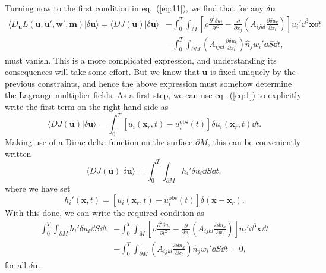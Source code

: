 Turning now to the first condition in eq.~(\ref{eq:11}), we find that for any $\delta \mathbf{u}$
\begin{align}
\langle D_{\mathbf{u}}L(\mathbf{u},\mathbf{u}',\mathbf{w}',\mathbf{m})|\delta \mathbf{u}\rangle = \langle DJ(\mathbf{u})|\delta \mathbf{u}\rangle &- \int_{0}^{T}\int_{M}\left[\rho\frac{\partial^{2}\delta u_{i}}{\partial t^{2}}-\frac{\partial}{\partial x_{j}}
\left(A_{ijkl}\frac{\partial\delta u_{k}}{\partial x_{l}}\right)\right]u_{i}'\dd^{3}\mathbf{x}\dd t \nonumber \\
&- \int_{0}^{T}\int_{\partial M}\left(A_{ijkl}\frac{\partial\delta u_{k}}{\partial x_{l}}\right)\hat{n}_{j}w_{i}'\dd S\dd t,
\label{eq:16}
\end{align}
must vanish. This is a more complicated expression, and understanding its consequences will take some effort. 
But we know that $\mathbf{u}$ is fixed uniquely by the previous constraints, and hence the above expression 
must somehow determine the Lagrange multiplier fields. As a first step, we can use eq.~(\ref{eq:1}) to explicitly write 
the first term on the right-hand side as
\begin{equation}
\langle DJ(\mathbf{u})|\delta \mathbf{u}\rangle=\int_{0}^{T}[u_{i}(\mathbf{x}_{r},t)-u_{i}^{\mathrm{obs}}(t)]\delta u_{i}(\mathbf{x}_{r},t)\dd t.
\label{eq:17}
\end{equation}
Making use of a Dirac delta function on the surface $\partial M$, this can be conveniently written
\begin{equation}
\langle DJ(\mathbf{u})|\delta \mathbf{u}\rangle=\int_{0}^{T}\int_{\partial M}h_{i}'\delta u_{i}\dd S\dd t,
\label{eq:18}
\end{equation}
where we have set
\begin{equation}
h_{i}'(\mathbf{x},t)=[u_{i}(\mathbf{x}_{r},t)-u_{i}^{\mathrm{obs}}(t)]\delta(\mathbf{x}-\mathbf{x}_{r}).
\label{eq:19}
\end{equation}
With this done, we can write the required condition as
\begin{align}
\int_{0}^{T}\int_{\partial M}h_{i}'\delta u_{i}\dd S\dd t &- \int_{0}^{T}\int_{M}\left[\rho\frac{\partial^{2}\delta u_{i}}{\partial t^{2}}-\frac{\partial}{\partial x_{j}}
\left(A_{ijkl}\frac{\partial\delta u_{k}}{\partial x_{l}}\right)\right]u_{i}'\dd^{3}\mathbf{x}\dd t \nonumber \\
&- \int_{0}^{T}\int_{\partial M}\left(A_{ijkl}\frac{\partial\delta u_{k}}{\partial x_{l}}\right)\hat{n}_{j}w_{i}'\dd S\dd t=0,
\label{eq:20}
\end{align}
for all $\delta \mathbf{u}$. 

